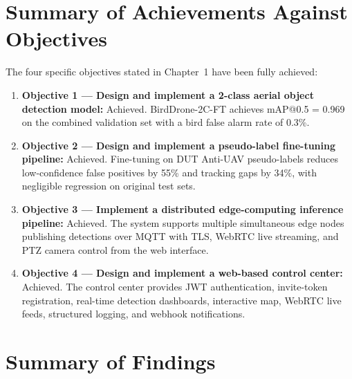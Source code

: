 \documentclass[12pt,a4paper]{report}
\begin{document}
\section{Summary of Achievements Against Objectives}

The four specific objectives stated in Chapter~1 have been fully achieved:

\begin{enumerate}
  \item \textbf{Objective 1 --- Design and implement a 2-class aerial object
        detection model:} Achieved. BirdDrone-2C-FT achieves mAP@0.5 = 0.969
        on the combined validation set with a bird false alarm rate of 0.3\%.
  \item \textbf{Objective 2 --- Design and implement a pseudo-label fine-tuning
        pipeline:} Achieved. Fine-tuning on DUT Anti-UAV pseudo-labels reduces
        low-confidence false positives by 55\% and tracking gaps by 34\%,
        with negligible regression on original test sets.
  \item \textbf{Objective 3 --- Implement a distributed edge-computing
        inference pipeline:} Achieved. The system supports multiple simultaneous
        edge nodes publishing detections over MQTT with TLS, WebRTC live
        streaming, and PTZ camera control from the web interface.
  \item \textbf{Objective 4 --- Design and implement a web-based control
        center:} Achieved. The control center provides JWT authentication,
        invite-token registration, real-time detection dashboards, interactive
        map, WebRTC live feeds, structured logging, and webhook notifications.
\end{enumerate}

\section{Summary of Findings}
\end{document}

